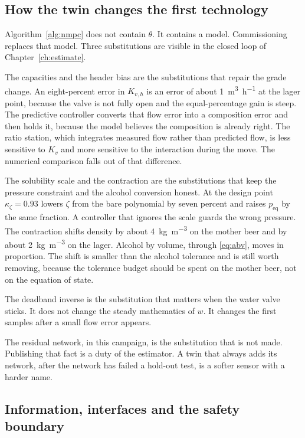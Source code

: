 \subsection{How the twin changes the first technology}

Algorithm~\ref{alg:nmpc} does not contain $\theta$. It contains a model. Commissioning replaces that model. Three substitutions are visible in the closed loop of Chapter~\ref{ch:estimate}.

The capacities and the header bias are the substitutions that repair the grade change. An eight-percent error in $K_{v,h}$ is an error of about \SI{1}{\cubic\metre\per\hour} at the lager point, because the valve is not fully open and the equal-percentage gain is steep. The predictive controller converts that flow error into a composition error and then holds it, because the model believes the composition is already right. The ratio station, which integrates measured flow rather than predicted flow, is less sensitive to $K_v$ and more sensitive to the interaction during the move. The numerical comparison falls out of that difference.

The solubility scale and the contraction are the substitutions that keep the pressure constraint and the alcohol conversion honest. At the design point $\kappa_{\zeta}=0.93$ lowers $\zeta$ from the bare polynomial by seven percent and raises $p_{\mathrm{eq}}$ by the same fraction. A controller that ignores the scale guards the wrong pressure. The contraction shifts density by about \SI{4}{\kilogram\per\cubic\metre} on the mother beer and by about \SI{2}{\kilogram\per\cubic\metre} on the lager. Alcohol by volume, through \eqref{eq:abv}, moves in proportion. The shift is smaller than the alcohol tolerance and is still worth removing, because the tolerance budget should be spent on the mother beer, not on the equation of state.

The deadband inverse is the substitution that matters when the water valve sticks. It does not change the steady mathematics of $w$. It changes the first samples after a small flow error appears.

The residual network, in this campaign, is the substitution that is not made. Publishing that fact is a duty of the estimator. A twin that always adds its network, after the network has failed a hold-out test, is a softer sensor with a harder name.

\subsection{Information, interfaces and the safety boundary}

